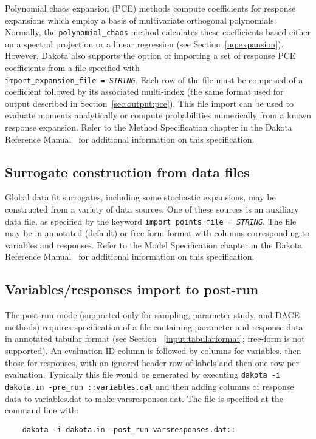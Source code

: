 Polynomial chaos expansion (PCE) methods compute coefficients for
response expansions which employ a basis of multivariate orthogonal
polynomials.  Normally, the \texttt{polynomial\_chaos} method
calculates these coefficients based either on a spectral projection or
a linear regression (see Section~\ref{uq:expansion}).  However, Dakota
also supports the option of importing a set of response PCE
coefficients from a file specified with \\
\texttt{import\_expansion\_file = \emph{STRING}}.  Each row of the
file must be comprised of a coefficient followed by its associated
multi-index (the same format used for output described in
Section~\ref{sec:output:pce}).  This file import can be used to
evaluate moments analytically or compute probabilities numerically
from a known response expansion.  Refer to the Method Specification
chapter in the Dakota Reference Manual~\cite{RefMan} for additional
information on this specification.

\subsection{Surrogate construction from data files}

Global data fit surrogates, including some stochastic expansions, may
be constructed from a variety of data sources.  One of these sources
is an auxiliary data file, as specified by the keyword \texttt{import\
  points\_file = \emph{STRING}}.  The file may be in annotated
(default) or free-form format with columns corresponding to variables
and responses.  Refer to the Model Specification chapter in the Dakota
Reference Manual~\cite{RefMan} for additional information on this
specification.

\subsection{Variables/responses import to post-run}

The post-run mode (supported only for sampling, parameter study, and
DACE methods) requires specification of a file containing parameter
and response data in annotated tabular format (see Section
~\ref{input:tabularformat}; free-form is not supported).  An
evaluation ID column is followed by columns for variables, then those
for responses, with an ignored header row of labels and then one row
per evaluation.  Typically this file would be generated by executing
\texttt{dakota -i dakota.in -pre\_run ::variables.dat} and then adding
columns of response data to variables.dat to make varsresponses.dat.
The file is specified at the command line with:
\begin{small}
\begin{verbatim}
    dakota -i dakota.in -post_run varsresponses.dat::
\end{verbatim}
\end{small}

